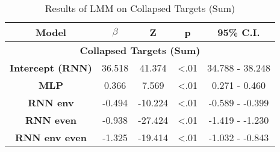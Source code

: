 \begin{table}[h]
\centering
\caption{Results of LMM on Collapsed Targets (Sum)}
\label{collapsed_lmm_33}
\begin{tabular}{ccccc}
\hline
\textbf{Model}           & \textbf{$\beta$} & \textbf{Z} & \textbf{p} & \textbf{95\% C.I.} \\ \hline
\multicolumn{5}{c}{\textbf{Collapsed Targets (Sum)}}                                                 \\ \hline
\textbf{Intercept (RNN)} & 36.518                & 41.374     & \textless .01   & 34.788 - 38.248      \\
\textbf{MLP}           & 0.366                 & 7.569     & \textless .01   & 0.271 - 0.460        \\
\textbf{RNN env}          & -0.494                 & -10.224     & \textless .01   & -0.589 - -0.399        \\
\textbf{RNN even}            & -0.938                 & -27.424     & \textless .01   & -1.419 - -1.230        \\
\textbf{RNN env even}             & -1.325                 & -19.414     & \textless .01   & -1.032 - -0.843        \\ \hline
\end{tabular}
\end{table}